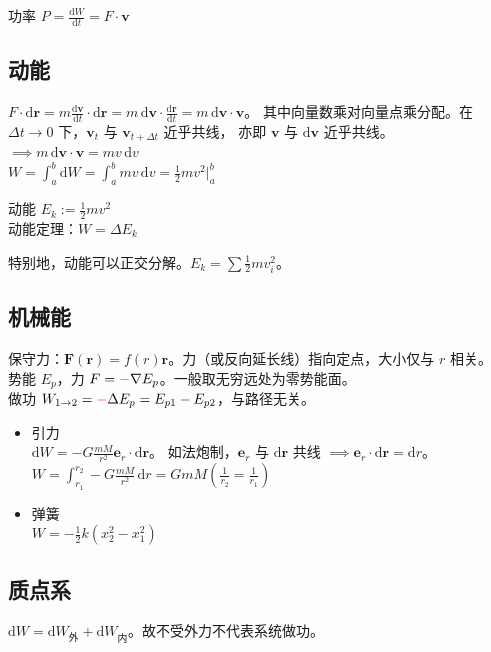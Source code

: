 \documentclass[12pt, a4paper, UTF8, openany]{ctexbook}
\newcommand{\dif}{\mathrm{d}}
\newcommand{\sdif}{\,\mathrm{d}}
\newcommand{\vect}[1]{\mathbf{#1}}
\newcommand{\vecr}{\vect{r}}
\newcommand{\vecv}{\vect{v}}
\begin{document}
    功率 $P = \frac{\dif W}{\dif t} = F \cdot \vecv$

        \subsection{动能}
        $F \cdot \dif\vecr = m \frac{\dif\vecv}{\dif t} \cdot \dif\vecr 
        = m \sdif\vecv \cdot \frac{\dif\vecr}{\dif t} = m \sdif\vecv \cdot \vecv$。
        其中向量数乘对向量点乘分配。在 $\Delta t \to 0$ 下，$\vecv_{t}$ 与 $\vecv_{t + \Delta t}$ 近乎共线，
        亦即 $\vecv$ 与 $\dif\vecv$ 近乎共线。$\implies m \sdif\vecv \cdot \vecv = mv\sdif v$ \\
        $W = \int_{a}^{b} \dif W = \int_{a}^{b} mv\sdif v = \frac{1}{2}mv^2|_{a}^{b}$

        动能 $E_{k} := \frac{1}{2}mv^2$ \\
        动能定理：$W = \Delta E_{k}$

        特别地，{\heiti 动能可以正交分解}。$E_{k} = \sum \frac{1}{2} m v_{i}^2$。

        \subsection{机械能}
        保守力：$\vect{F}(\vect{r}) = f(r)\vecr$。力（或反向延长线）指向定点，大小仅与 $r$ 相关。\\
        势能 $E_{p}$，力 $F = {\color{red}-} \nabla E_{p}$。一般取无穷远处为零势能面。\\
        做功 $W_{1 \to 2} = {\color{red}-} \Delta E_p = E_{p1} - E_{p2}$，与路径无关。

        \begin{itemize}
            \item 引力 \\
                $\dif W = -G \frac{mM}{r^2} \vect{e}_r \cdot \dif\vecr$。
                如法炮制，$\vect{e}_r$ 与 $\dif\vecr$ 共线 $\implies \vect{e}_r \cdot \dif\vecr = \dif r$。\\
                $W = \int_{r_1}^{r_2} -G\frac{mM}{r^2}\sdif r = GmM(\frac{1}{r_2} = \frac{1}{r_1})$
            \item 弹簧 \\
                $W = -\frac{1}{2}k (x_2^2 - x_1^2)$
        \end{itemize}

        \subsection{质点系}
        $\dif W = \dif W_{\text{外}} + \dif W_{\text{内}}$。故不受外力不代表系统做功。
\end{document}
